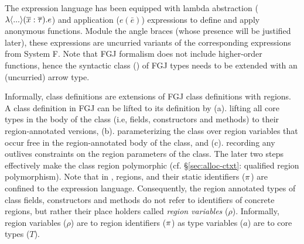 The expression language has been equipped with lambda abstraction
($\lambda\langle ... \rangle(\overline{x} : \overline{\tau}). e$) and application ($e(\bar{e})$)
expressions to define and apply anonymous functions. Module the angle
braces (whose presence will be justified later), these expressions are
uncurried variants of the corresponding expressions from System F.
Note that FGJ formalism does not include higher-order functions, hence
the syntactic class () of FGJ types needs to be extended with an
(uncurried) arrow type.

Informally, \FB class definitions are extensions of FGJ class
definitions with regions. A class definition in FGJ can be lifted to
its \FB definition by (a). lifting all core types in the body of the
class (i.e, fields, constructors and methods) to their
region-annotated versions, (b). parameterizing the class over
region variables that occur free in the region-annotated body of the
class, and (c). recording any outlives constraints on the region
parameters of the class. The later two steps effectively make the
class region polymorphic (cf. \S\ref{sec:alloc-ctxt}: qualified region
polymorphism). Note that in \FB, regions, and their static identifiers
($\pi$) are confined to the expression language. Consequently, the
region annotated types of class fields, constructors and methods do
not refer to identifiers of concrete regions, but rather their place
holders called \emph{region variables} ($\rho$). Informally, region
variables ($\rho$) are to region identifiers ($\pi$) as type
variables ($a$) are to core types ($T$). 

